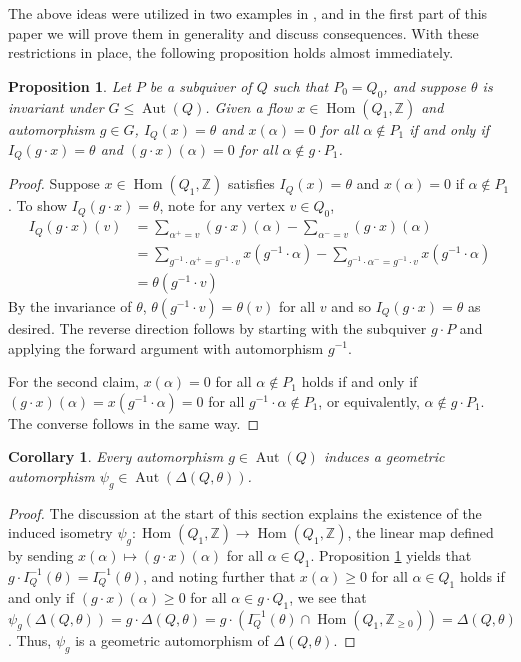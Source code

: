 \documentclass[12pt]{amsart}
\theoremstyle{plain}
\newtheorem{corollary}[theorem]{Corollary}
\newtheorem{proposition}[theorem]{Proposition}
\theoremstyle{definition}
\newcommand{\Z}{\mathbb{Z}}
\DeclareMathOperator{\aut}{Aut}
\DeclareMathOperator{\Hom}{Hom}
\renewcommand{\hom}{\Hom}
\begin{document}
The above ideas were utilized in two examples in \cite{hille2003quivers}, and in the first part of this paper we will prove them in generality and discuss consequences. With these restrictions in place, the following proposition holds almost immediately.
\begin{proposition} \label{quiver-action}
    Let $P$ be a subquiver of $Q$ such that $P_0 = Q_0$, and suppose $\theta$ is invariant under $G \leq \aut(Q)$. Given a flow $x \in \hom(Q_1, \Z)$ and automorphism $g \in G$, $I_Q(x) = \theta$ and $x(\alpha) = 0$ for all $\alpha \not\in P_1$ if and only if $I_Q(g \cdot x) = \theta$ and $(g \cdot x)(\alpha) = 0$ for all $\alpha \not\in g \cdot P_1$.
\end{proposition}

\begin{proof}
    Suppose $x \in \hom(Q_1, \Z)$ satisfies $I_Q(x) = \theta$ and $x(\alpha) = 0$ if $\alpha \not\in P_1$. To show $I_Q(g\cdot x) = \theta$, note for any vertex $v \in Q_0$,
    \begin{align*}
    I_Q(g\cdot x)(v) &= \sum_{\alpha^+ = v}(g \cdot x)(\alpha) - \sum_{\alpha^- = v}(g \cdot x)(\alpha) \\
    &= \sum_{g^{-1}\cdot \alpha^+ = g^{-1}\cdot v}x(g^{-1}\cdot \alpha) - \sum_{g^{-1} \cdot \alpha^- = g^{-1}\cdot v}x(g^{-1}\cdot \alpha) \\
    &= \theta(g^{-1}\cdot v) 
    \end{align*}
    By the invariance of $\theta$, $\theta(g^{-1} \cdot v) = \theta(v)$ for all $v$ and so $I_Q(g \cdot x) = \theta$ as desired. The reverse direction follows by starting with the subquiver $g \cdot P$ and applying the forward argument with automorphism $g^{-1}$.

    For the second claim, $x(\alpha) = 0$ for all $\alpha \not\in P_1$ holds if and only if $(g\cdot x)(\alpha) = x(g^{-1} \cdot \alpha) = 0$ for all $g^{-1} \cdot \alpha \not\in P_1$, or equivalently, $\alpha \not\in g \cdot P_1$. The converse follows in the same way.
\end{proof}

\begin{corollary} \label{polytope-action}
   Every automorphism $g \in \aut(Q)$ induces a geometric automorphism $\psi_g \in \aut(\Delta(Q, \theta))$.
\end{corollary}

\begin{proof}
    The discussion at the start of this section explains the existence of the induced isometry $\psi_g : \hom(Q_1, \Z) \longrightarrow \hom(Q_1, \Z)$, the linear map defined by sending $x(\alpha) \mapsto (g\cdot x)(\alpha)$ for all $\alpha \in Q_1$. Proposition \ref{quiver-action} yields that $g \cdot I_Q^{-1}(\theta) = I^{-1}_Q(\theta)$, and noting further that $x(\alpha) \geq 0$ for all $\alpha \in Q_1$ holds if and only if $(g\cdot x)(\alpha) \geq 0$ for all $\alpha \in g \cdot Q_1$, we see that $\psi_g(\Delta(Q, \theta)) = g \cdot\Delta(Q, \theta) =  g \cdot (I_Q^{-1}(\theta)\cap\hom(Q_1, \Z_{\geq 0})) = \Delta(Q, \theta)$. Thus, $\psi_g$ is a geometric automorphism of $\Delta(Q, \theta)$.
\end{proof}
\end{document}
